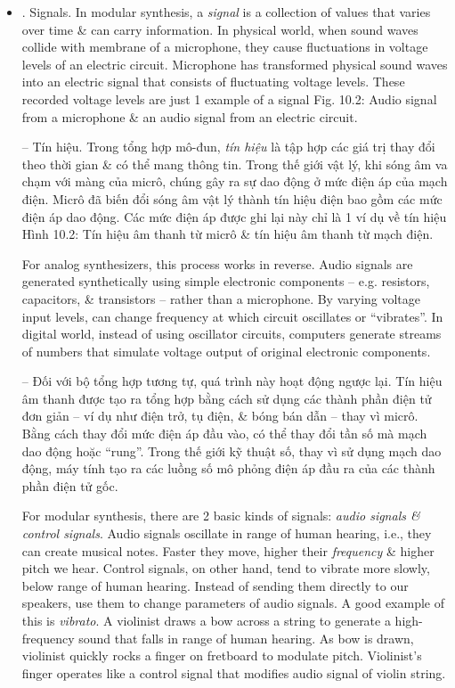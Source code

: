 \documentclass{article}
\begin{document}
\begin{itemize}
	\begin{itemize}
		\item {. Signals.} In modular synthesis, a {\it signal} is a collection of values that varies over time \& can carry information. In physical world, when sound waves collide with membrane of a microphone, they cause fluctuations in voltage levels of an electric circuit. Microphone has transformed physical sound waves into an electric signal that consists of fluctuating voltage levels. These recorded voltage levels are just 1 example of a signal {\sf Fig. 10.2: Audio signal from a microphone \& an audio signal from an electric circuit.}
		
		-- Tín hiệu. Trong tổng hợp mô-đun, {\it tín hiệu} là tập hợp các giá trị thay đổi theo thời gian \& có thể mang thông tin. Trong thế giới vật lý, khi sóng âm va chạm với màng của micrô, chúng gây ra sự dao động ở mức điện áp của mạch điện. Micrô đã biến đổi sóng âm vật lý thành tín hiệu điện bao gồm các mức điện áp dao động. Các mức điện áp được ghi lại này chỉ là 1 ví dụ về tín hiệu {\sf Hình 10.2: Tín hiệu âm thanh từ micrô \& tín hiệu âm thanh từ mạch điện.}
		
		For analog synthesizers, this process works in reverse. Audio signals are generated synthetically using simple electronic components -- e.g. resistors, capacitors, \& transistors -- rather than a microphone. By varying voltage input levels, can change frequency at which circuit oscillates or ``vibrates''. In digital world, instead of using oscillator circuits, computers generate streams of numbers that simulate voltage output of original electronic components.
		
		-- Đối với bộ tổng hợp tương tự, quá trình này hoạt động ngược lại. Tín hiệu âm thanh được tạo ra tổng hợp bằng cách sử dụng các thành phần điện tử đơn giản -- ví dụ như điện trở, tụ điện, \& bóng bán dẫn -- thay vì micrô. Bằng cách thay đổi mức điện áp đầu vào, có thể thay đổi tần số mà mạch dao động hoặc ``rung''. Trong thế giới kỹ thuật số, thay vì sử dụng mạch dao động, máy tính tạo ra các luồng số mô phỏng điện áp đầu ra của các thành phần điện tử gốc.
		
		For modular synthesis, there are 2 basic kinds of signals: {\it audio signals \& control signals}. Audio signals oscillate in range of human hearing, i.e., they can create musical notes. Faster they move, higher their {\it frequency} \& higher pitch we hear. Control signals, on other hand, tend to vibrate more slowly, below range of human hearing. Instead of sending them directly to our speakers, use them to change parameters of audio signals. A good example of this is {\it vibrato}. A violinist draws a bow across a string to generate a high-frequency sound that falls in range of human hearing. As bow is drawn, violinist quickly rocks a finger on fretboard to modulate pitch. Violinist's finger operates like a control signal that modifies audio signal of violin string.
		

\end{itemize}
\end{itemize}
\end{document}

